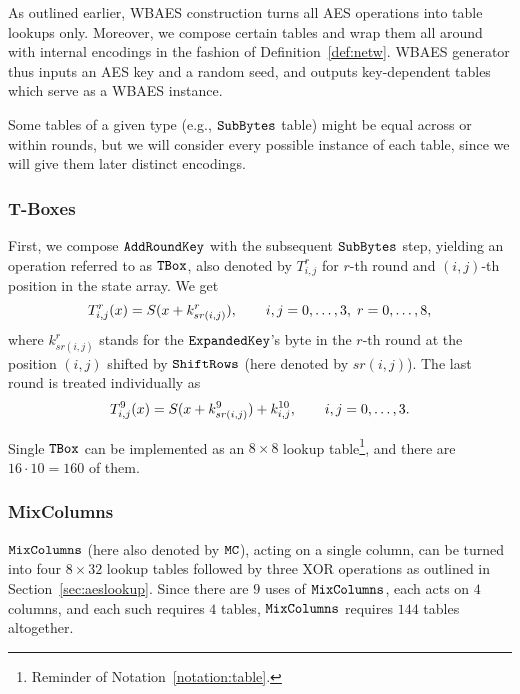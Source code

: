 As outlined earlier, WBAES construction turns all AES operations into table lookups only. Moreover, we compose certain tables and wrap them all around with internal encodings in the fashion of Definition~\ref{def:netw}. WBAES generator thus inputs an AES key and a random seed, and outputs key-dependent tables which serve as a WBAES instance.

\begin{note}
\label{note:tableinst}
	Some tables of a given type (e.g., $\texttt{SubBytes}$ table) might be equal across or within rounds, but we will consider every possible instance of each table, since we will give them later distinct encodings.
\end{note}

\subsubsection{T-Boxes}
	
	First, we compose $\texttt{AddRoundKey}$ with the subsequent $\texttt{SubBytes}$ step, yielding an operation referred to as $\texttt{TBox}$, also denoted by $T_{i,j}^r$ for $r$-th round and $(i,j)$-th position in the state array. We get
	\begin{equation*}
		T_{i,j}^r(x) = S(x+k_{sr(i,j)}^r) , \qquad i,j=0 , \ldots , 3,\;r=0 , \ldots , 8 ,
	\end{equation*}
	where $k_{sr(i,j)}^r$ stands for the $\texttt{ExpandedKey}$'s byte in the $r$-th round at the position $(i,j)$ shifted by $\texttt{ShiftRows}$ (here denoted by $sr(i,j)$). The last round is treated individually as
	\begin{equation}
	\label{eq:lasttbox}
		T_{i,j}^{9}(x) = S(x+k_{sr(i,j)}^9) + k_{i,j}^{10} , \qquad i,j=0 , \ldots , 3 .
	\end{equation}
	
	Single $\texttt{TBox}$ can be implemented as an $8\times 8$ lookup table\footnote{Reminder of Notation~\ref{notation:table}.}, and there are $16\cdot 10 = 160$ of them.

\subsubsection{MixColumns}
	
	$\texttt{MixColumns}$ (here also denoted by $\texttt{MC}$), acting on a single column, can be turned into four $8\times 32$ lookup tables followed by three XOR operations as outlined in Section~\ref{sec:aeslookup}. Since there are $9$ uses of $\texttt{MixColumns}$, each acts on $4$ columns, and each such requires $4$ tables, $\texttt{MixColumns}$ requires $144$ tables altogether.
	
